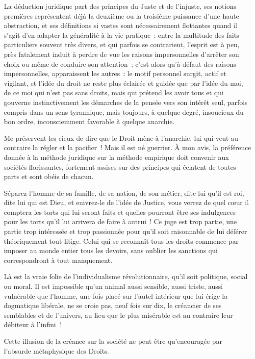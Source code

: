\documentclass[french,twoside]{book} %
\newcommand{\astermono}{\medskip\centerline{\color{rubric}\large\selectfont{\syms ✻}}\medskip\par}%
\begin{document}
\astermono

\noindent La déduction juridique part des principes du Juste et de l’injuste, ses notions premières représentent déjà la deuxième ou la troisième puissance d’une haute abstraction, et ses définitions si vastes sont nécessairement flottantes quand il s’agit d’en adapter la généralité à la vie pratique : entre la multitude des faits particuliers souvent très divers, et qui parfois se contrarient, l’esprit est à peu, près fatalement induit à perdre de vue les raisons impersonnelles d’arrêter son choix ou même de conduire son attention ; c’est alors qu’à défaut des raisons impersonnelles, apparaissent les autres : le motif personnel surgit, actif et vigilant, et l’idée du droit ne reste plus éclairée et guidée que par l’idée du moi, de ce moi qui n’est pas sans droits, mais qui prétend les avoir tous et qui gouverne instinctivement les démarches de la pensée vers son intérêt seul, parfois compris dans un sens tyrannique, mais toujours, à quelque degré, insoucieux du bon ordre, inconsciemment favorable à quelque anarchie.\par
Me préservent les cieux de dire que le Droit mène à l’anarchie, lui qui veut au contraire la régler et la pacifier ! Mais il est né guerrier. À mon avis, la préférence donnée à la méthode juridique sur la méthode empirique doit convenir aux sociétés florissantes, fortement assises sur des principes qui éclatent de toutes parts et sont obéis de chacun.\par

\astermono

\noindent Séparez l’homme de sa famille, de sa nation, de son métier, dite lui qu’il est roi, dite lui qui est Dieu, et enivrez-le de l’idée de Justice, vous verrez de quel cœur il comptera les torts qui lui seront faits et quelles pourront être ses indulgences pour les torts qu’il lui arrivera de faire à autrui ! Ce juge est trop partie, une partie trop intéressée et trop passionnée pour qu’il soit raisonnable de lui déférer théoriquement tout litige. Celui qui se reconnaît tous les droits commence par imposer au monde entier tous les devoirs, sans oublier les sanctions qui correspondront à tout manquement.\par
Là est la vraie folie de l’individualisme révolutionnaire, qu’il soit politique, social ou moral. Il est impossible qu’un animal aussi sensible, aussi triste, aussi vulnérable que l’homme, une fois placé sur l’autel intérieur que lui érige la dogmatique libérale, ne se croie pas, neuf fois sur dix, le créancier de ses semblables et de l’univers, au lieu que le plus misérable est au contraire leur débiteur à l’infini !\par
Cette illusion de la créance sur la société ne peut être qu’encouragée par l’absurde métaphysique des Droits.\par
\end{document}
